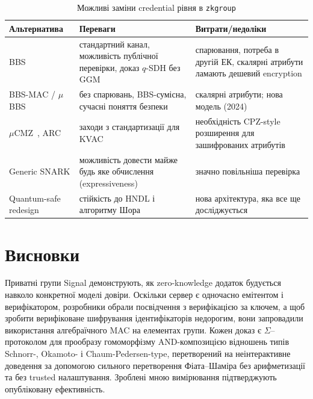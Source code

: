\begin{table}[!ht]
  \centering
  \small
  \begin{tabularx}{\linewidth}{@{}l X X@{}}
    \toprule
    Альтернатива                             & Переваги                                                                      & Витрати/недоліки \\
    \midrule
    BBS~\cite{BBSdraft,TZ23}                 & стандартний канал, можливість публічної перевірки, доказ $q$-SDH без GGM
                                             & спарювання, потреба в другій ЕК, скалярні атрибути ламають дешевий encryption                    \\
    BBS-MAC / $\mu$BBS~\cite{BBDT16,Orru24}  & без спарювань, BBS-сумісна, сучасні поняття безпеки
                                             & скалярні атрибути; нова модель (2024)                                                            \\
    $\mu$CMZ~\cite{Orru24}, ARC~\cite{ARC25} & заходи з стандартизації для KVAC
                                             & необхідність CPZ-style розширення для зашифрованих атрибутів                                     \\
    Generic SNARK                            & можливість довести майже будь яке обчислення (expressiveness)
                                             & значно повільніша перевірка                                                                      \\
    Quantum-safe redesign~\cite{Connell26}   & стійкість до HNDL і алгоритму Шора
                                             & нова архітектура, яка все ще досліджується                                                       \\
    \bottomrule
  \end{tabularx}
  \caption{Можливі заміни credential рівня в \texttt{zkgroup}}
  \label{tab:alternatives}
\end{table}

\section*{Висновки}
{}

Приватні групи Signal демонструють, як zero-knowledge додаток будується навколо конкретної моделі довіри. Оскільки 
сервер є одночасно емітентом і верифікатором, розробники обрали посвідчення з верифікацією за ключем, а щоб 
зробити верифіковане шифрування ідентифікаторів недорогим, вони запровадили використання алгебраїчного MAC на 
елементах групи. Кожен доказ є $\Sigma$--протоколом для прообразу гомоморфізму AND-композицією відношень типів 
Schnorr-, Okamoto- і Chaum-Pedersen-type, перетворений на неінтерактивне доведення за допомогою сильного 
перетворення Фіата–Шаміра без арифметизації та без trusted налаштування. Зроблені мною вимірювання підтверджують 
опубліковану ефективність.

